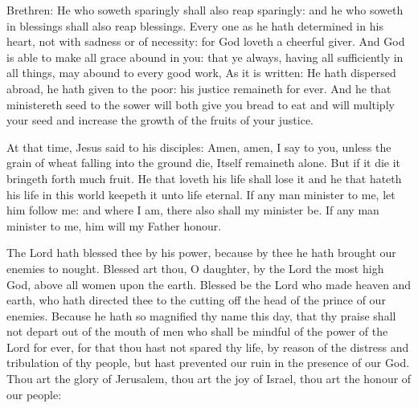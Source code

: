 \bigskip




Brethren: He who soweth sparingly shall also reap sparingly:
and he who soweth in blessings shall also reap blessings.
Every one as he hath determined in his heart, not with sadness or
of necessity: for God loveth a cheerful giver.
And God is able to make all grace abound in you: that ye always,
having all sufficiently in all things, may abound to every good work,
As it is written: He hath dispersed abroad, he hath given to the
poor: his justice remaineth for ever.
And he that ministereth seed to the sower will both give you bread
to eat and will multiply your seed and increase the growth of the fruits
of your justice.



At that time, Jesus said to his disciples:
Amen, amen, I say to you, unless the grain of wheat falling into
the ground die,
Itself remaineth alone. But if it die it bringeth forth much
fruit. He that loveth his life shall lose it and he that hateth his life
in this world keepeth it unto life eternal.
If any man minister to me, let him follow me: and where I am,
there also shall my minister be. If any man minister to me, him will my
Father honour.



\bigskip
\columnbreak



\label{Ep.assump}

The Lord hath
blessed thee by his power, because by thee he hath brought our enemies
to nought.
Blessed art thou, O daughter, by the Lord the most high God, above all
women upon the earth.
Blessed be the Lord who made heaven and earth, who hath directed
thee to the cutting off the head of the prince of our enemies.
Because he hath so magnified thy name this day, that thy praise
shall not depart out of the mouth of men who shall be mindful of the
power of the Lord for ever, for that thou hast not spared thy life, by
reason of the distress and tribulation of thy people, but hast prevented
our ruin in the presence of our God.
Thou art the glory of Jerusalem, thou art the joy of
Israel, thou art the honour of our people:



